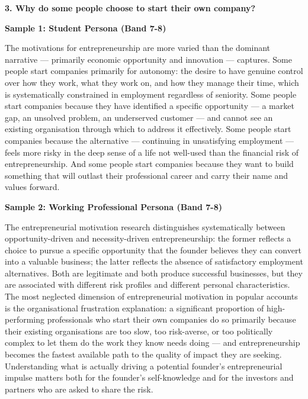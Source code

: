 \separator

\begin{ieltsquestion}
\textbf{3. Why do some people choose to start their own company?}
\end{ieltsquestion}
\textbf{Sample 1: Student Persona (Band 7-8)}

The motivations for entrepreneurship are more varied than the dominant narrative — primarily economic opportunity and innovation — captures. Some people start companies primarily for autonomy: the desire to have genuine control over how they work, what they work on, and how they manage their time, which is systematically constrained in employment regardless of seniority. Some people start companies because they have identified a specific opportunity — a market gap, an unsolved problem, an underserved customer — and cannot see an existing organisation through which to address it effectively. Some people start companies because the alternative — continuing in unsatisfying employment — feels more risky in the deep sense of a life not well-used than the financial risk of entrepreneurship. And some people start companies because they want to build something that will outlast their professional career and carry their name and values forward.

\textbf{Sample 2: Working Professional Persona (Band 7-8)}

The entrepreneurial motivation research distinguishes systematically between opportunity-driven and necessity-driven entrepreneurship: the former reflects a choice to pursue a specific opportunity that the founder believes they can convert into a valuable business; the latter reflects the absence of satisfactory employment alternatives. Both are legitimate and both produce successful businesses, but they are associated with different risk profiles and different personal characteristics. The most neglected dimension of entrepreneurial motivation in popular accounts is the organisational frustration explanation: a significant proportion of high-performing professionals who start their own companies do so primarily because their existing organisations are too slow, too risk-averse, or too politically complex to let them do the work they know needs doing — and entrepreneurship becomes the fastest available path to the quality of impact they are seeking. Understanding what is actually driving a potential founder's entrepreneurial impulse matters both for the founder's self-knowledge and for the investors and partners who are asked to share the risk.

